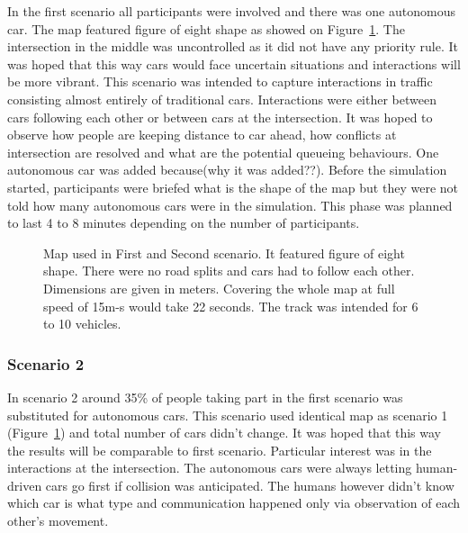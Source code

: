 \documentclass[11pt,english]{article}
\begin{document}
In the first scenario all participants were involved and there was one autonomous car. The map featured figure of eight shape as showed on Figure~\ref{fig:map_1_arrows}. The intersection in the middle was uncontrolled as it did not have any priority rule. It was hoped that this way cars would face uncertain situations and interactions will be more vibrant. This scenario was intended to capture interactions in traffic consisting almost entirely of traditional cars. Interactions were either between cars following each other or between cars at the intersection. It was hoped to observe how people are keeping distance to car ahead, how conflicts at intersection are resolved and what are the potential queueing behaviours.
One autonomous car was added because(why it was added??). Before the simulation started, participants were briefed what is the shape of the map but they were not told how many autonomous cars were in the simulation. This phase was planned to last 4 to 8 minutes depending on the number of participants.


\begin{figure}[] %
\caption{Map used in First and Second scenario. It featured figure of eight shape. There were no road splits and cars had to follow each other. Dimensions are given in meters. Covering the whole map at full speed of 15m-s would take 22 seconds. The track was intended for 6 to 10 vehicles.}
\label{fig:map_1_arrows}
\end{figure}


\subsubsection*{Scenario 2}

In scenario 2 around 35\% of people taking part in the first scenario was substituted for autonomous cars. This scenario used identical map as scenario 1 (Figure~\ref{fig:map_1_arrows}) and total number of cars didn't change. It was hoped that this way the results will be comparable to first scenario. Particular interest was in the interactions at the intersection. The autonomous cars were always letting human-driven cars go first if collision was anticipated. The humans however didn't know which car is what type and communication happened only via observation of each other's movement. 
\end{document}
